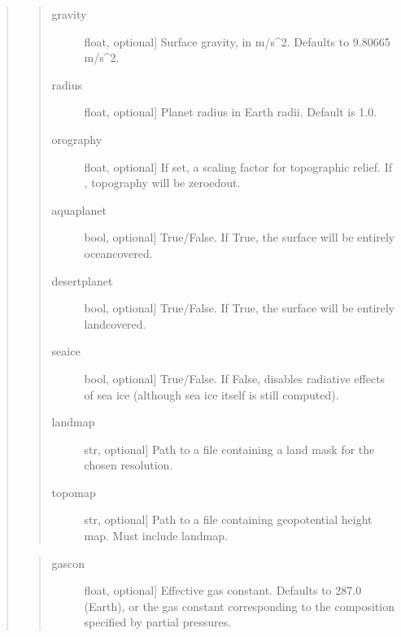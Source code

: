 \documentclass[letterpaper,10pt,english]{sphinxmanual}
\begin{document}
\begin{fulllineitems}
\begin{fulllineitems}
\begin{quote}
\begin{quote}
\begin{description}
\end{description}
\end{quote}

\begin{quote}
\begin{description}
\item[{gravity}] \leavevmode{[}float, optional{]}
Surface gravity, in m/s\textasciicircum{}2. Defaults to 9.80665 m/s\textasciicircum{}2.

\item[{radius}] \leavevmode{[}float, optional{]}
Planet radius in Earth radii. Default is 1.0.

\item[{orography}] \leavevmode{[}float, optional{]}
If set, a scaling factor for topographic relief. If , topography
will be zeroed\sphinxhyphen{}out.

\item[{aquaplanet}] \leavevmode{[}bool, optional{]}
True/False. If True, the surface will be entirely ocean\sphinxhyphen{}covered.

\item[{desertplanet}] \leavevmode{[}bool, optional{]}
True/False. If True, the surface will be entirely land\sphinxhyphen{}covered.

\item[{seaice}] \leavevmode{[}bool, optional{]}
True/False. If False, disables radiative effects of sea ice (although sea ice
itself is still computed).

\item[{landmap}] \leavevmode{[}str, optional{]}
Path to a  file containing a land mask for the chosen resolution.

\item[{topomap}] \leavevmode{[}str, optional{]}
Path to a  file containing geopotential height map. Must include landmap.

\end{description}
\end{quote}

\begin{quote}
\begin{description}
\item[{gascon}] \leavevmode{[}float, optional{]}
Effective gas constant. Defaults to 287.0 (Earth), or the gas constant
corresponding to the composition specified by partial pressures.


\end{description}
\end{quote}
\end{quote}
\end{fulllineitems}
\end{fulllineitems}
\end{document}
